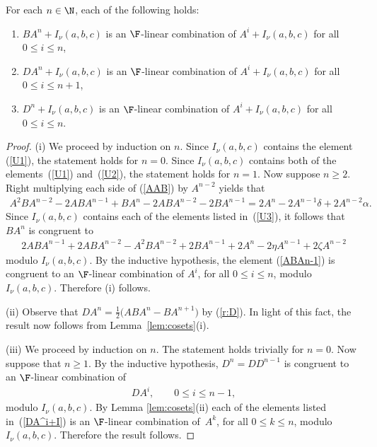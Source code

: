 \begin{Lemma}\label{lem:cosets}For each $n\in \N$, each of the following holds:
\begin{enumerate}\itemsep=0pt
\item[$(i)$] $BA^n+I_\nu(a,b,c)$ is an $\F$-linear combination of $A^i+I_\nu(a,b,c)$ for all $0\leq i\leq n$,
\item[$(ii)$] $DA^n+I_\nu(a,b,c)$ is an $\F$-linear combination of $A^i+I_\nu(a,b,c)$ for all $0\leq i\leq n+1$,
\item[$(iii)$] $D^n+I_\nu(a,b,c)$ is an $\F$-linear combination of $A^i+I_\nu(a,b,c)$ for all $0\leq i\leq n$.
\end{enumerate}
\end{Lemma}
\begin{proof} (i) We proceed by induction on $n$. Since $I_\nu(a,b,c)$ contains the element (\ref{U1}), the statement holds for $n=0$. Since $I_\nu(a,b,c)$ contains both of the elements~(\ref{U1}) and~(\ref{U2}), the statement holds for $n=1$. Now suppose $n\geq 2$. Right multiplying each side of (\ref{AAB}) by $A^{n-2}$ yields that
\begin{gather*}
A^2 B A^{n-2}
-2 A B A^{n-1}
+B A^n
-2 A B A^{n-2}
-2 B A^{n-1}
=2 A^n-2 A^{n-1}\delta+2A^{n-2}\alpha.
\end{gather*}
Since $I_\nu(a,b,c)$ contains each of the elements listed in~(\ref{U3}), it follows that $B A^n$ is congruent to
\begin{gather}\label{ABAn-1}
2 A B A^{n-1}+2 A B A^{n-2}-A^2 B A^{n-2}+2 B A^{n-1}+2 A^n-2\eta A^{n-1}+2\zeta A^{n-2}
\end{gather}
modulo $I_\nu(a,b,c)$. By the inductive hypothesis, the element (\ref{ABAn-1}) is congruent to an $\F$-linear combination of $A^i$, for all $0\leq i\leq n$, modulo $I_\nu(a,b,c)$. Therefore (i) follows.

(ii) Observe that $DA^n=\frac{1}{2}\big(ABA^{n}-BA^{n+1}\big)$ by (\ref{r:D}). In light of this fact, the result now follows from Lemma~\ref{lem:cosets}(i).

(iii) We proceed by induction on $n$. The statement holds trivially for $n=0$. Now suppose that $n\geq 1$. By the inductive hypothesis, $D^n=DD^{n-1}$ is congruent to an $\F$-linear combination of
\begin{gather}\label{DA^i+I}
DA^i, \qquad 0\leq i\leq n-1,
\end{gather}
modulo $I_\nu(a,b,c)$. By Lemma \ref{lem:cosets}(ii) each of the elements listed in~(\ref{DA^i+I}) is an $\F$-linear combination of~$A^k$, for all $0\leq k\leq n$, modulo $I_\nu(a,b,c)$. Therefore the result follows.
\end{proof}

